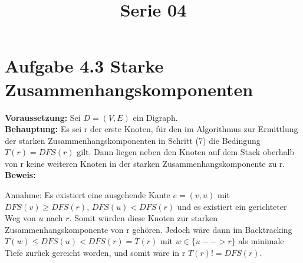  
\title{Serie 04}

 

\section*{Aufgabe 4.3 Starke Zusammenhangskomponenten}

\textbf{Voraussetzung: }Sei $D=(V,E)$ ein Digraph.\\
\noindent
\textbf{Behauptung: } Es sei r der erste Knoten, für den im Algorithmus zur Ermittlung der starken Zusammenhangskomponenten in Schritt (7) die Bedingung $T(r) =  DFS(r)$ gilt. Dann liegen neben den Knoten auf dem Stack oberhalb von r keine weiteren Knoten in der starken Zusammenhangskomponente zu r.\\
\noindent
\textbf{Beweis: }

Annahme: Es existiert eine ausgehende Kante $e = (v,u)$ mit $DFS(v) \geq DFS(r)$, $DFS(u) < DFS(r)$ und es existiert ein gerichteter Weg von $u$ nach $r$. Somit würden diese Knoten zur starken Zusammenhangskomponente von r gehören. Jedoch wäre dann im Backtracking $T(w) \leq DFS(u) < DFS(r) = T(r)$ mit $w \in \{u --> r\}$ als minimale Tiefe zurück gereicht worden, und somit wäre in r $T(r) != DFS(r)$.





